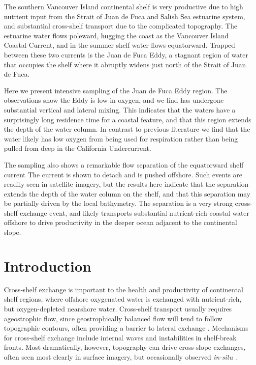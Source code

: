 \documentclass[draft]{agujournal2019}
\begin{document}
The southern Vancouver Island continental shelf is very productive due to high nutrient input from the Strait of Juan de Fuca and Salish Sea estuarine system, and substantial cross-shelf transport due to the complicated topography.  The estuarine water flows poleward, hugging the coast as the Vancouver Island Coastal Current, and in the summer shelf water flows equatorward.  Trapped between these two currents is the Juan de Fuca Eddy, a stagnant region of water that occupies the shelf where it abruptly widens just north of the Strait of Juan de Fuca.

Here we present intensive sampling of the Juan de Fuca Eddy region. The observations show the Eddy is low in oxygen, and we find has undergone substantial vertical and lateral mixing. This indicates that the waters have a surprisingly long residence time for a coastal feature, and that this region extends the depth of the water column.  In contrast to previous literature we find that the water likely has low oxygen from being used for respiration rather than being pulled from deep in the California Undercurrent.

The sampling also shows a remarkable flow separation of the equatorward shelf current  The current is shown to detach and is pushed offshore. Such events are readily seen in satellite imagery, but the results here indicate that the separation extends the depth of the water column on the shelf, and that this separation may be partially driven by the local bathymetry.  The separation is a very strong cross-shelf exchange event, and likely transports substantial nutrient-rich coastal water offshore to drive productivity in the deeper ocean adjacent to the continental slope.

%
%


\section{Introduction}

Cross-shelf exchange is important to the health and productivity of continental shelf regions, where offshore oxygenated water is exchanged with nutrient-rich, but oxygen-depleted nearshore water.  Cross-shelf transport usually requires ageostrophic flow, since geostrophically balanced flow will tend to follow topographic contours, often providing a barrier to lateral exchange \cite{brink16}.  Mechanisms for cross-shelf exchange include internal waves and instabilities in shelf-break fronts.  Most-dramatically, however, topography can drive cross-slope exchanges, often seen most clearly in surface imagery, but occasionally observed \emph{in-situ} \cite{barthetal00}.
\end{document}
